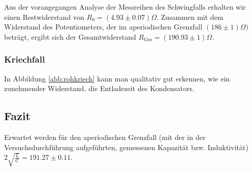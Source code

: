 \documentclass[a4paper, 12pt]{scrartcl}
\begin{document}
Aus der vorangegangen Analyse der Messreihen des Schwingfalls erhalten wir einen Restwiderstand von $R_0 = (4.93\pm0.07)\Omega$. Zusammen mit dem Widerstand des Potentiometers, der im aperiodischen Grenzfall $(186\pm 1)\Omega)$ beträgt, ergibt sich der Gesamtwiderstand $R_{\text{Ges}} = (190.93 \pm 1)\Omega$.
\subsubsection{Kriechfall}
In Abbildung \ref{abb:rohkriech} kann man qualitativ gut erkennen, wie ein zunehmender Widerstand, die Entladezeit des Kondensators.


\subsection{Fazit}
Erwartet werden für den aperiodischen Grenzfall (mit der in der Versuchsdurchführung aufgeführten, gemessenen Kapazität bzw. Induktivität) $2\sqrt{\frac{L}{C}} = 191.27 \pm 0.11$. 


\newpage




\newpage
\appendix
\end{document}
